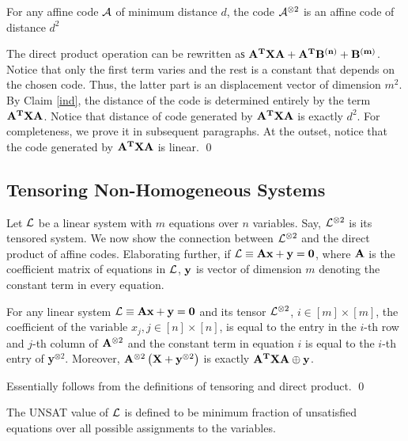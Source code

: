 {\begin{claim}\label{fin}
For any affine code ${\cal A}$ of minimum distance $d$, the code ${\cal A}^{\otimes 2}$ is an affine code of
distance $d^2$
\end{claim}
 The direct product operation can be rewritten aѕ
${\bf A^T X A} + {\bf A^T B^{(n)}} + {\bf B^{(m)}}$.  Notice that only
the first term varies and the rest is a constant that depends on the
chosen code.  Thus, the latter part is an displacement vector of
dimension $m^2$. By Claim \ref{ind}, the distance of the code is
determined entirely by the term ${\bf A^T X A}$. Notice that distance
of code generated by ${\bf A^T X A}$ is exactly $d^2$. For
completeness, we prove it in subsequent paragraphs.  At the outset,
notice that the code generated by ${\bf A^TXA}$ is linear. \qed


\subsection{Tensoring Non-Homogeneous Systems}

Let $\eL$ be a linear system with $m$ equations over $n$
variables. Say, ${\cal L}^{\otimes 2}$ is its tensored system. We now show
the connection between ${\cal L}^{\otimes 2}$ and the direct product of
affine codes. Elaborating further, if ${\cal L} \equiv {\bf Ax + y = 0}$,
where ${\bf A}$ is the coefficient matrix of equations in $\eL$, ${\bf
  y}$ is vector of dimension $m$ denoting the constant term in every
equation.

\begin{claim} \label{same} For any linear system ${\cal L} \equiv {\bf Ax +
    y} = {\bf 0}$ and its tensor ${\cal L}^{\otimes 2}$, $i \in [m] \times
  [m]$, the coefficient of the variable $x_{j}, j \in [n] \times [n]$,
  is equal to the entry in the $i$-th row and $j$-th column of ${\bf
    A}^{\otimes 2}$ and the constant term in equation $i$ is equal to
  the $i$-th entry of {\bf y}$^{\otimes 2}$. Moreover, ${\bf
    A}^{\otimes 2}\left({\bf X} + {\bf y}^{\otimes 2}\right)$ is
  exactly ${\bf A^TXA} \oplus {\bf y}$.
\end{claim}
 Essentially follows from the definitions of
tensoring and direct product. \qed


\begin{definition}[UNSAT($\eL$)] The UNSAT value of $\eL$ is
defined to be minimum fraction of unsatisfied equations over 
all possible assignments to the variables.
\end{definition}

}
